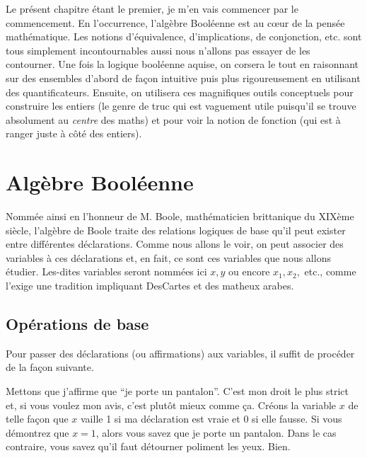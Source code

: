 Le présent chapitre étant le premier, je m'en vais commencer par le
commencement. En l'occurrence, l'algèbre Booléenne est au cœur de la
pensée mathématique. Les notions d'équivalence, d'implications, de
conjonction, etc. sont tous simplement incontournables aussi nous
n'allons pas essayer de les contourner. Une fois la logique booléenne
aquise, on corsera le tout en raisonnant sur des ensembles d'abord de
façon intuitive puis plus rigoureusement en utilisant des
quantificateurs. Ensuite, on utilisera ces magnifiques outils
conceptuels pour construire les entiers (le genre de truc qui est
vaguement utile puisqu'il se trouve absolument au \emph{centre} des
maths) et pour voir la notion de fonction (qui est à ranger juste à
côté des entiers).

\section{Algèbre Booléenne}


Nommée ainsi en l'honneur de M. Boole, mathématicien brittanique du
XIXème siècle, l'algèbre de Boole traite des relations logiques de
base qu'il peut exister entre différentes déclarations. Comme nous
allons le voir, on peut associer des variables à ces déclarations et,
en fait, ce sont ces variables que nous allons étudier. Les-dites
variables seront nommées ici $x,y$ ou encore $x_1,x_2,$ etc., comme
l'exige une tradition impliquant DesCartes et des matheux arabes.

\subsection{Opérations de base}


Pour passer des déclarations (ou affirmations) aux variables, il
suffit de procéder de la façon suivante.

Mettons que j'affirme que ``je porte un pantalon''. C'est mon droit le
plus strict et, si vous voulez mon avis, c'est plutôt mieux comme
ça. Créons la variable $x$ de telle façon que $x$ vaille 1 si ma
déclaration est vraie et 0 si elle fausse. Si vous démontrez que
$x=1$, alors vous savez que je porte un pantalon. Dans le cas
contraire, vous savez qu'il faut détourner poliment les yeux. Bien.


